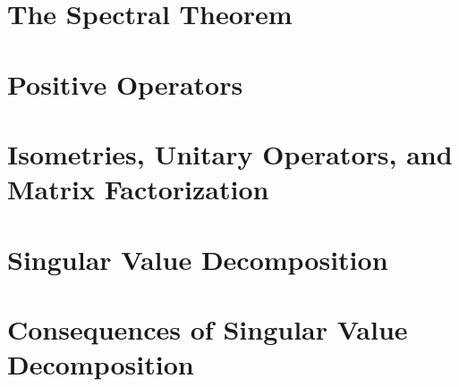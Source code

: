 \section{The Spectral Theorem}

\section{Positive Operators}

\section{Isometries, Unitary Operators, and Matrix Factorization}

\section{Singular Value Decomposition}

\section{Consequences of Singular Value Decomposition}


